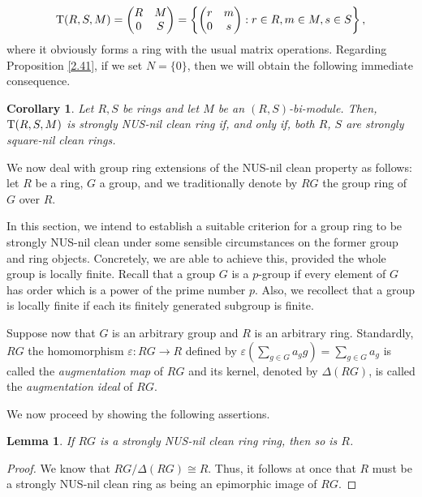 \documentclass[12pt]{amsart}
\newtheorem{lemma}[theorem]{Lemma}
\newtheorem{corollary}[theorem]{Corollary}
\theoremstyle{definition}
\begin{document}
$$
{\rm T}(R, S, M) =
\begin{pmatrix}
	R& M \\
	0& S
\end{pmatrix}
=
\left\{
\begin{pmatrix}
	r& m \\
	0& s
\end{pmatrix}
: r \in R, m \in M, s \in S
\right\},
$$
where it obviously forms a ring with the usual matrix operations. Regarding Proposition \ref{2.41}, if we set $N =\{0\}$, then we will obtain the following immediate consequence.

\begin{corollary}\label{2.42}
Let $R,S$ be rings and let $M$ be an $(R,S)$-bi-module. Then, ${\rm T}(R,S,M)$ is strongly NUS-nil clean ring if, and only if, both $R$, $S$ are strongly square-nil clean rings.
\end{corollary}

We now deal with group ring extensions of the NUS-nil clean property as follows: let $R$ be a ring, $G$ a group, and we traditionally denote by $RG$ the group ring of $G$ over $R$. 

In this section, we intend to establish a suitable criterion for a group ring to be strongly NUS-nil clean under some sensible circumstances on the former group and ring objects. Concretely, we are able to achieve this, provided the whole group is locally finite. Recall that a group $G$ is a $p$-group if every element of $G$ has order which is a power of the prime number $p$. Also, we recollect that a group is locally finite if each its finitely generated subgroup is finite.

Suppose now that $G$ is an arbitrary group and $R$ is an arbitrary ring. Standardly, $RG$ the homomorphism $\varepsilon :RG\rightarrow R$ defined by $\varepsilon (\displaystyle\sum_{g\in G}a_{g}g)=\displaystyle\sum_{g\in G}a_{g}$ is called the {\it augmentation map} of $RG$ and its kernel, denoted by $\Delta (RG)$, is called the {\it augmentation ideal} of $RG$.

\medskip

We now proceed by showing the following assertions.

\begin{lemma} \label{3.1}
If $RG$ is a strongly NUS-nil clean ring ring, then so is $R$.
\end{lemma}

\begin{proof}
We know that $RG/\Delta(RG) \cong R$. Thus, it follows at once that $R$ must be a strongly NUS-nil clean ring as being an epimorphic image of $RG$.
\end{proof}
\end{document}
